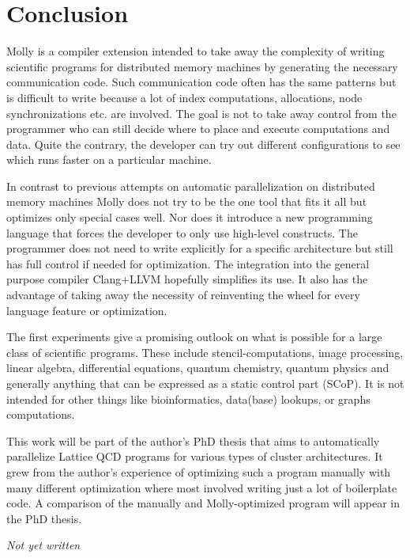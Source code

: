 \documentclass{sigplanconf}
\begin{document}
\section{Conclusion}\label{sct:conclusion}

Molly is a compiler extension intended to take away the complexity of writing scientific programs for distributed memory machines by generating the necessary communication code. Such communication code often has the same patterns but is difficult to write because a lot of index computations, allocations, node synchronizations etc. are involved. The goal is not to take away control from the programmer who can still decide where to place and execute computations and data. Quite the contrary, the developer can try out different configurations to see which runs faster on a particular machine.

In contrast to previous attempts on automatic parallelization on distributed memory machines Molly does not try to be the one tool that fits it all but optimizes only special cases well. Nor does it introduce a new programming language that forces the developer to only use high-level constructs. The programmer does not need to write explicitly for a specific architecture but still has full control if needed for optimization. The integration into the general purpose compiler Clang+LLVM hopefully simplifies its use. It also has the advantage of taking away the necessity of reinventing the wheel for every language feature or optimization.

The first experiments give a promising outlook on what is possible for a large class of scientific programs. These include stencil-computations, image processing, linear algebra, differential equations, quantum chemistry, quantum physics and generally anything that can be expressed as a static control part (SCoP). It is not intended for other things like bioinformatics, data(base) lookups, or graphs computations.

This work will be part of the author's PhD thesis that aims to automatically parallelize Lattice QCD programs for various types of cluster architectures. It grew from the author's experience of optimizing such a program manually with many different optimization where most involved writing just a lot of boilerplate code. A comparison of the manually and Molly-optimized program will appear in the PhD thesis.


\acks

\emph{Not yet written}
\end{document}
